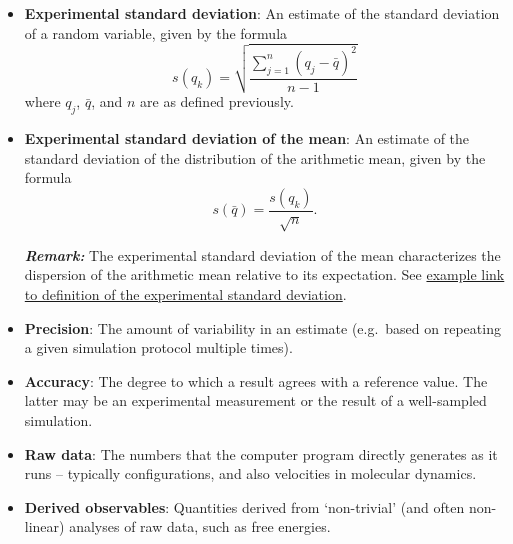 \begin{itemize}
\item {\bf Experimental standard deviation}: An estimate of the standard deviation of a random variable, given by the formula
  \begin{equation}
    s\left(q_k\right) = \sqrt{\dfrac{\sum_{j=1}^n\left(q_j - \bar{q}\right)^2}{n-1}} \label{def:exp_st_dev}
  \end{equation}
  where $q_j$, $\bar{q}$, and $n$ are as defined previously. 
  
\item {\bf Experimental standard deviation of the mean}: An estimate of the standard deviation of the distribution of the arithmetic mean, given by the formula
  \begin{equation}
    s\left(\bar{q}\right) = \dfrac{s\left(q_k\right)}{\sqrt{n}}. \label{def:exp_st_dev_mean}
  \end{equation}
  
  \medskip
  
\textbf{\textit{Remark:}} The experimental standard deviation of the mean characterizes the dispersion of the arithmetic mean relative to its expectation.
See \hyperref[def:exp_st_dev]{example link to definition of the experimental standard deviation}.
  
\item {\bf Precision}: The amount of variability in an estimate (e.g.\ based on repeating a given simulation protocol multiple times).  %
  
  
\item {\bf Accuracy}: The degree to which a result agrees with a reference value.
The latter may be an experimental measurement or the result of a well-sampled simulation.  
  
\item {\bf Raw data}: The numbers that the computer program directly generates as it runs -- typically configurations, and also velocities in molecular dynamics.  
  
\item {\bf Derived observables}: Quantities derived from `non-trivial' (and often non-linear) analyses of raw data, such as free energies.


\end{itemize}
